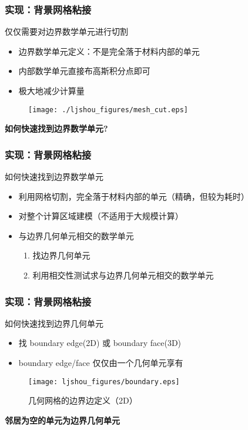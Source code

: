 \documentclass[mathserif]{beamer}
\begin{document}
\begin{CJK}{UTF8}{gkai}
\begin{frame}
	\frametitle{实现：背景网格粘接}
	仅仅需要对边界数学单元进行切割
	\begin{itemize}
		\item 边界数学单元定义：不是完全落于材料内部的单元
		\item 内部数学单元直接布高斯积分点即可
		\item 极大地减少计算量
	\end{itemize}				
	\begin{figure}
			\centering
			\texttt{[image: ./ljshou\_figures/mesh\_cut.eps]}
	\end{figure}
	\begin{block}{}
		\bf \color{blue} 如何快速找到边界数学单元?
	\end{block}
\end{frame}

\begin{frame}
	\frametitle{实现：背景网格粘接}
	如何快速找到边界数学单元
	\begin{itemize}
		\item 利用网格切割，完全落于材料内部的单元（精确，但较为耗时）
		\item 对整个计算区域建模（不适用于大规模计算）
		\item 与边界几何单元相交的数学单元
		\begin{enumerate}
			\item 找边界几何单元
			\item 利用相交性测试求与边界几何单元相交的数学单元
		\end{enumerate}
	\end{itemize}

\end{frame}

\begin{frame}
	\frametitle{实现：背景网格粘接}
	如何快速找到边界几何单元
	\begin{itemize}
		\item 找 boundary edge(2D) 或 boundary face(3D)
		\item boundary edge/face 仅仅由一个几何单元享有
	\end{itemize}
	\begin{figure}
		\texttt{[image: ljshou\_figures/boundary.eps]}
		\caption{几何网格的边界边定义（2D）}
	\end{figure}
	\begin{block}{}
		\bf \color{blue} 邻居为空的单元为边界几何单元
	\end{block}
\end{frame}


\end{CJK}
\end{document}
